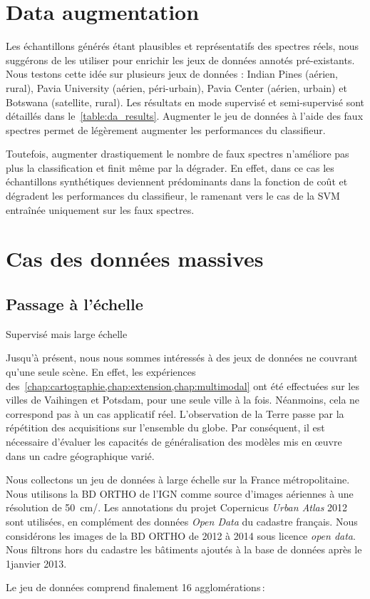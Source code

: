 \section{Data augmentation}
\label{sec:augmentation}

Les échantillons générés étant plausibles et représentatifs des spectres réels, nous suggérons de les utiliser pour enrichir les jeux de données annotés pré-existants. Nous testons cette idée sur plusieurs jeux de données : Indian Pines (aérien, rural), Pavia University (aérien, péri-urbain), Pavia Center (aérien, urbain) et Botswana (satellite, rural). Les résultats en mode supervisé et semi-supervisé sont détaillés dans le~\cref{table:da_results}. Augmenter le jeu de données à l'aide des faux spectres permet de légèrement augmenter les performances du classifieur.

Toutefois, augmenter drastiquement le nombre de faux spectres n'améliore pas plus la classification et finit même par la dégrader. En effet, dans ce cas les échantillons synthétiques deviennent prédominants dans la fonction de coût et dégradent les performances du classifieur, le ramenant vers le cas de la \gls{SVM} entraînée uniquement sur les faux spectres.

\section{Cas des données massives}

\subsection{Passage à l'échelle}

Supervisé mais large échelle

Jusqu'à présent, nous nous sommes intéressés à des jeux de données ne couvrant qu'une seule scène. En effet, les expériences des~\cref{chap:cartographie,chap:extension,chap:multimodal} ont été effectuées sur les villes de Vaihingen et Potsdam, pour une seule ville à la fois. Néanmoins, cela ne correspond pas à un cas applicatif réel. L'observation de la Terre passe par la répétition des acquisitions sur l'ensemble du globe. Par conséquent, il est nécessaire d'évaluer les capacités de généralisation des modèles mis en \oe{}uvre dans un cadre géographique varié.



Nous collectons un jeu de données à large échelle sur la France métropolitaine. Nous utilisons la BD ORTHO de l'\gls{IGN} comme source d'images aériennes à une résolution de \SI{50}{\centi\meter/\px}. Les annotations du projet Copernicus \emph{Urban Atlas} 2012 sont utilisées, en complément des données \emph{Open Data} du cadastre français. Nous considérons les images de la BD ORTHO de 2012 à 2014 sous licence \emph{open data}. Nous filtrons hors du cadastre les bâtiments ajoutés à la base de données après le 1\ier janvier 2013.

Le jeu de données comprend finalement 16 agglomérations\,:





%
%
\printbibliography
